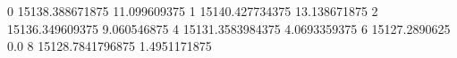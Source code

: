 0 15138.388671875 11.099609375
1 15140.427734375 13.138671875
2 15136.349609375 9.060546875
4 15131.3583984375 4.0693359375
6 15127.2890625 0.0
8 15128.7841796875 1.4951171875
